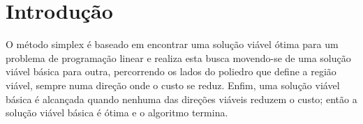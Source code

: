 \documentclass[
	12pt,				%
	openright,			%
	oneside,			%
	a4paper,			%
	english,			%
	french,				%
	spanish,			%
	brazil,				%
	]{abntex2}
\begin{document}
\chapter*[Introdução]{Introdução}

O método simplex é baseado em encontrar uma solução viável ótima para um problema de programação linear e realiza esta busca movendo-se de uma solução viável básica para outra, percorrendo os lados do poliedro que define a região viável, sempre numa direção onde o custo se reduz. Enfim, uma solução viável básica é alcançada quando nenhuma das direções viáveis reduzem o custo; então a solução viável básica é ótima e o algoritmo termina.
\end{document}
